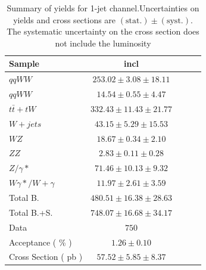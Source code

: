 \begin{table}[!ht]
{\small
\begin{center}
\begin{tabular}{|l|c|c|c|c|}
\hline
Sample  & incl  \\ \hline
$qqWW$  & $253.02 \pm 3.08 \pm 18.11 $  \\
$qqWW$  & $14.54 \pm 0.55 \pm 4.47 $    \\
$t\bar{t} + tW$ & $332.43 \pm 11.43 \pm 21.77 $ \\
$W+jets$    & $43.15 \pm 5.29 \pm 15.53 $   \\
$WZ$    & $18.67 \pm 0.34 \pm 2.10 $    \\
$ZZ$    & $2.83 \pm 0.11 \pm 0.28 $ \\
$Z/\gamma*$ & $71.46 \pm 10.13 \pm 9.32 $   \\
$W\gamma*/W+\gamma$ & $11.97 \pm 2.61 \pm 3.59 $    \\
\hline \hline
Total B.    & $480.51 \pm 16.38 \pm 28.63 $ \\ \hline \hline
Total B.+S. & $748.07 \pm 16.68 \pm 34.17 $ \\ \hline \hline
Data    & $750$     \\ \hline \hline
Acceptance ( \% )   & $1.26 \pm 0.10    $\\
Cross Section ( pb )    & $57.52 \pm 5.85 \pm 8.37$     \\ \hline
\end{tabular}
\caption{Summary of yields for 1-jet channel.Uncertainties on yields and cross sections are $\mathrm{(stat.)} \pm \mathrm{(syst.)}$. The systematic uncertainty on the cross section does not include the luminosity}
\label{tab:datayields_wwxsec_1j_incl}
\end{center}}
\end{table}

